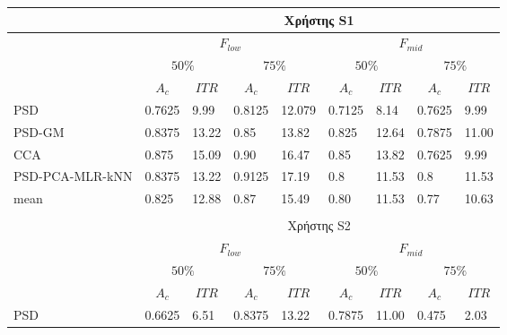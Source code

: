 \documentclass[11pt,a4paper,english,greek,twoside]{../Thesis}
\begin{document}
\begin{table}[H]
    \centering
    \begin{tabular}{ |p{4cm}||p{1cm}|p{1cm}|p{1cm}|p{1cm}|p{1cm}|p{1cm}|p{1cm}|p{1cm}|}
        \hline
        \multicolumn{1}{|c||}{}& \multicolumn{8}{c|}{Χρήστης S1}\\
        \hline
        & \multicolumn{4}{c|}{$F_{low}$} & \multicolumn{4}{c|}{$F_{mid}$} \\
        \hline
        & \multicolumn{2}{c|}{$50\%$} & \multicolumn{2}{c|}{$75\%$} &
        \multicolumn{2}{c|}{$50\%$} & \multicolumn{2}{c|}{$75\%$} \\
        \hline
        & \multicolumn{1}{c|}{$A_c$} & \multicolumn{1}{c|}{$ITR$} &
         \multicolumn{1}{c|}{$A_c$} & \multicolumn{1}{c|}{$ITR$} &
          \multicolumn{1}{c|}{$A_c$} & \multicolumn{1}{c|}{$ITR$} &
           \multicolumn{1}{c|}{$A_c$} & \multicolumn{1}{c|}{$ITR$} \\
        \hline
        PSD             & 0.7625&   9.99&  0.8125& 12.079& 0.7125&  8.14& 0.7625&   9.99 \\
        PSD-GM          & 0.8375&  13.22&    0.85& 13.82&  0.825& 12.64& 0.7875&  11.00 \\
        CCA             &  0.875&  15.09&    0.90& 16.47&   0.85& 13.82& 0.7625&   9.99 \\
        PSD-PCA-MLR-kNN & 0.8375&  13.22&    0.9125& 17.19&     0.8& 11.53&    0.8&  11.53 \\
        \hline
        mean            &  0.825&  12.88&   0.87& 15.49&   0.80& 11.53& 0.77&   10.63 \\
        \hline
        \multicolumn{5}{c}{}\\
        \hline
        \multicolumn{1}{|c||}{}& \multicolumn{8}{c|}{Χρήστης S2}\\
        \hline
        & \multicolumn{4}{c|}{$F_{low}$} & \multicolumn{4}{c|}{$F_{mid}$} \\
        \hline
        & \multicolumn{2}{c|}{$50\%$} & \multicolumn{2}{c|}{$75\%$} &
        \multicolumn{2}{c|}{$50\%$} & \multicolumn{2}{c|}{$75\%$} \\
        \hline
        & \multicolumn{1}{c|}{$A_c$} & \multicolumn{1}{c|}{$ITR$} &
         \multicolumn{1}{c|}{$A_c$} & \multicolumn{1}{c|}{$ITR$} &
          \multicolumn{1}{c|}{$A_c$} & \multicolumn{1}{c|}{$ITR$} &
           \multicolumn{1}{c|}{$A_c$} & \multicolumn{1}{c|}{$ITR$} \\
        \hline
        PSD             & 0.6625&    6.51& 0.8375&  13.22& 0.7875&  11.00&  0.475&  2.03 \\

\end{tabular}
\end{table}
\end{document}
